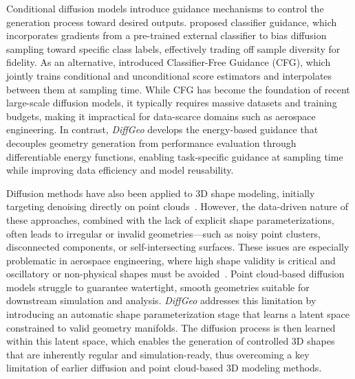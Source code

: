 Conditional diffusion models introduce guidance mechanisms to control the generation process toward desired outputs. \citet{ai.Dhariwal2021} proposed classifier guidance, which incorporates gradients from a pre-trained external classifier to bias diffusion sampling toward specific class labels, effectively trading off sample diversity for fidelity. As an alternative, \citet{ai.Ho2022} introduced Classifier-Free Guidance (CFG), which jointly trains conditional and unconditional score estimators and interpolates between them at sampling time. While CFG has become the foundation of recent large-scale diffusion models, it typically requires massive datasets and training budgets, making it impractical for data-scarce domains such as aerospace engineering. In contrast, \textit{DiffGeo} develops the energy-based guidance that decouples geometry generation from performance evaluation through differentiable energy functions, enabling task-specific guidance at sampling time while improving data efficiency and model reusability.

Diffusion methods have also been applied to 3D shape modeling, initially targeting denoising directly on point clouds~\cite{ai.Yang2019d,ai.Mao2023}. However, the data-driven nature of these approaches, combined with the lack of explicit shape parameterizations, often leads to irregular or invalid geometries—such as noisy point clusters, disconnected components, or self-intersecting surfaces. These issues are especially problematic in aerospace engineering, where high shape validity is critical and oscillatory or non-physical shapes must be avoided~\cite{aa.Masood2024}. Point cloud-based diffusion models struggle to guarantee watertight, smooth geometries suitable for downstream simulation and analysis. \textit{DiffGeo} addresses this limitation by introducing an automatic shape parameterization stage that learns a latent space constrained to valid geometry manifolds. The diffusion process is then learned within this latent space, which enables the generation of controlled 3D shapes that are inherently regular and simulation-ready, thus overcoming a key limitation of earlier diffusion and point cloud-based 3D modeling methods.